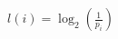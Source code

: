 \documentclass[preview]{standalone}
\begin{document}
\begin{align*}
l(i) = \log_2(\frac{1}{p_i})
\end{align*}
\end{document}
